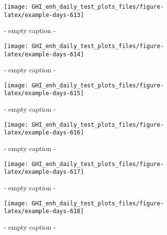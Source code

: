\documentclass[
  10pt,
  a4paper,oneside]{article}
\begin{document}
\begin{figure}[H]

{\centering \texttt{[image: GHI\_enh\_daily\_test\_plots\_files/figure-latex/example-days-613]} 

}

\caption{ - empty caption - }\label{fig:example-days-613}
\end{figure}

\begin{figure}[H]

{\centering \texttt{[image: GHI\_enh\_daily\_test\_plots\_files/figure-latex/example-days-614]} 

}

\caption{ - empty caption - }\label{fig:example-days-614}
\end{figure}

\begin{figure}[H]

{\centering \texttt{[image: GHI\_enh\_daily\_test\_plots\_files/figure-latex/example-days-615]} 

}

\caption{ - empty caption - }\label{fig:example-days-615}
\end{figure}

\begin{figure}[H]

{\centering \texttt{[image: GHI\_enh\_daily\_test\_plots\_files/figure-latex/example-days-616]} 

}

\caption{ - empty caption - }\label{fig:example-days-616}
\end{figure}

\begin{figure}[H]

{\centering \texttt{[image: GHI\_enh\_daily\_test\_plots\_files/figure-latex/example-days-617]} 

}

\caption{ - empty caption - }\label{fig:example-days-617}
\end{figure}

\begin{figure}[H]

{\centering \texttt{[image: GHI\_enh\_daily\_test\_plots\_files/figure-latex/example-days-618]} 

}

\caption{ - empty caption - }\label{fig:example-days-618}
\end{figure}
\end{document}
